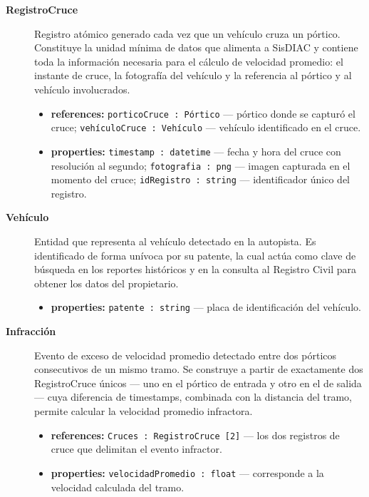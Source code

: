\documentclass[12pt,letterpaper]{article}
\begin{document}
{\begin{description}
		\item[\textbf{RegistroCruce}]
		      Registro atómico generado cada vez que un vehículo cruza un pórtico. Constituye la unidad mínima de datos que alimenta a SisDIAC y contiene toda la información necesaria para el cálculo de velocidad promedio: el instante de cruce, la fotografía del vehículo y la referencia al pórtico y al vehículo involucrados.
		      \begin{itemize}
			      \item \textbf{references:} \texttt{porticoCruce : Pórtico} — pórtico donde se capturó el cruce; \texttt{vehículoCruce : Vehículo} — vehículo identificado en el cruce.
			      \item \textbf{properties:} \texttt{timestamp : datetime} — fecha y hora del cruce con resolución al segundo; \texttt{fotografia : png} — imagen capturada en el momento del cruce; \texttt{idRegistro : string} — identificador único del registro.
		      \end{itemize}

		\item[\textbf{Vehículo}]
		      Entidad que representa al vehículo detectado en la autopista. Es identificado de forma unívoca por su patente, la cual actúa como clave de búsqueda en los reportes históricos y en la consulta al Registro Civil para obtener los datos del propietario.
		      \begin{itemize}
			      \item \textbf{properties:} \texttt{patente : string} — placa de identificación del vehículo.
		      \end{itemize}

		\item[\textbf{Infracción}]
		      Evento de exceso de velocidad promedio detectado entre dos pórticos consecutivos de un mismo tramo. Se construye a partir de exactamente dos RegistroCruce únicos — uno en el pórtico de entrada y otro en el de salida — cuya diferencia de timestamps, combinada con la distancia del tramo, permite calcular la velocidad promedio infractora.
		      \begin{itemize}
			      \item \textbf{references:} \texttt{Cruces : RegistroCruce [2]} — los dos registros de cruce que delimitan el evento infractor.
			      \item \textbf{properties:} \texttt{velocidadPromedio : float} — corresponde a la velocidad calculada del tramo.

		      \end{itemize}


\end{description}}
\end{document}

